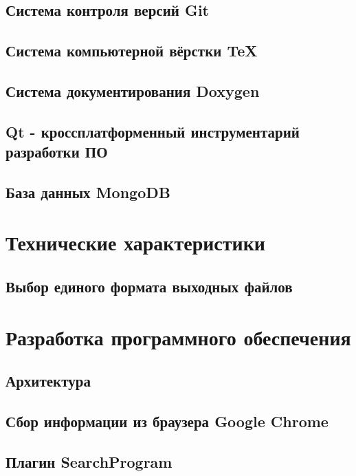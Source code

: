\subsection{Система контроля версий Git}

\subsection{Система компьютерной вёрстки \TeX}

\subsection{Система документирования Doxygen}

\subsection{Qt - кроссплатформенный инструментарий разработки ПО}

\subsection{База данных MongoDB}


\section{Технические характеристики}

\subsection{Выбор единого формата выходных файлов}


\section{Разработка программного обеспечения}
\setcounter{figure}{0}
 
\subsection{Архитектура}


\newpage
\subsection{Сбор информации из браузера Google Chrome} %


\newpage
\subsection{Плагин SearchProgram} %


